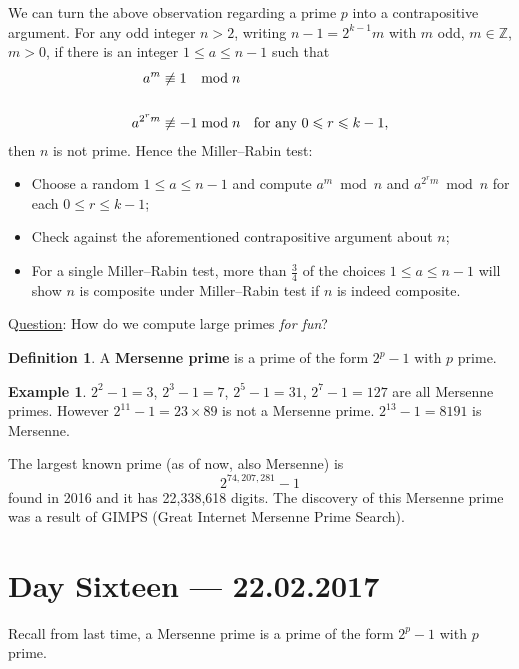 \documentclass{amsbook}
\theoremstyle{plain}
\theoremstyle{definition}
\newtheorem{definition}[theorem]{Definition}
\newtheorem{example}[theorem]{Example}
\theoremstyle{remark}
\numberwithin{equation}{chapter}
\numberwithin{figure}{chapter}
\newcommand{\Z}{\mathbb{Z}}
\begin{document}
We can turn the above observation regarding a prime $p$ into a contrapositive argument. For any odd integer $n > 2$, writing $n - 1 = 2^{k-1}m$ with $m$ odd, $m \in \Z$, $m > 0$, if there is an integer $1 \leqslant a \leqslant n-1$ such that
\begin{align}
  a^m &\not\equiv 1 \hspace{2.7mm} \bmod n \\
&\hspace{-55mm} \text { \underline{and} }\\
  a^{2^r m} &\not\equiv -1 \bmod n \text{ \hspace{1mm}~for any $0 \leqslant r \leqslant k-1$},
\end{align}
then $n$ is not prime.
Hence the Miller--Rabin test: 
\begin{itemize}
\item Choose a random $1 \leqslant a \leqslant n-1$ and compute $a^m \bmod n$ and $a^{2^rm} \bmod n$ for each $0 \leqslant r \leqslant k - 1$; 
\item Check against the aforementioned contrapositive argument about $n$;
\item For a single Miller--Rabin test, more than $\frac{3}4$ of the choices $1 \leqslant a \leqslant n - 1$ will show $n$ is composite under Miller--Rabin test if $n$ is indeed composite.
\end{itemize}

Q\underline{uestion}: How do we compute large primes \emph{for fun}?

\begin{definition}
  A \textbf{Mersenne prime} is a prime of the form $2^p - 1$ with $p$ prime.
\end{definition}
\begin{example}
  $2^2-1 = 3$, $2^3-1 = 7$, $2^5-1 = 31$, $2^7-1 = 127$ are all Mersenne primes. However $2^{11}-1 = 23\times 89$ is not a Mersenne prime. $2^{13}-1 = 8191$ is Mersenne.  
\end{example}
The largest known prime (as of now, also Mersenne) is
\[
  2^{74,207,281} - 1
\]
found in 2016 and it has 22,338,618 digits. The discovery of this Mersenne prime was a result of GIMPS (Great Internet Mersenne Prime Search).

\chapter[Lecture Sixteen]{Day Sixteen \hfill {\footnotesize \rm --- 22.02.2017}}

Recall from last time, a Mersenne prime is a prime of the form $2^p - 1$ with $p$ prime.
\end{document}
